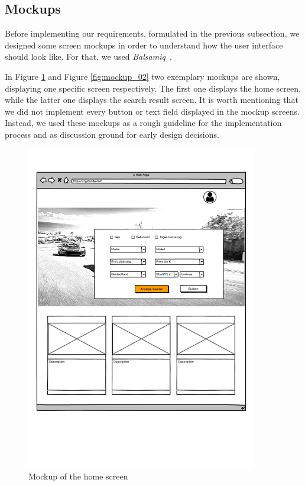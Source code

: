 \subsection{Mockups}

Before implementing our requirements, formulated in the previous subsection, we designed some screen mockups in order to understand how the user interface should look like. For that, we used \textit{Balsamiq}~\cite{Balsamiq}.

In Figure \ref{fig:mockup_01} and Figure \ref{fig:mockup_02} two exemplary mockups are shown, displaying one specific screen respectively. The first one displays the home screen, while the latter one displays the search result screen. It is worth mentioning that we did not implement every button or text field displayed in the mockup screens. Instead, we used these mockups as a rough guideline for the implementation process and as discussion ground for early design decisions.

\begin{figure}[htbp]
\centerline{\includegraphics[width=0.9\textwidth]{figures/mockup_screen_01.pdf}}
\caption{Mockup of the home screen \label{fig:mockup_01}}
\end{figure}

